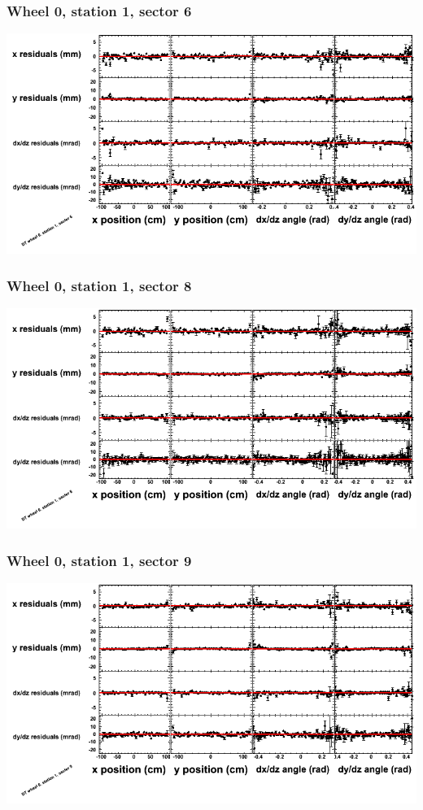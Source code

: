 \documentclass[compress]{beamer}
\begin{document}
\begin{frame}
\frametitle{Wheel 0, station 1, sector 6}
\includegraphics[width=\linewidth]{tmppoly_MBwhCst1sec06.png}
\end{frame}

\begin{frame}
\frametitle{Wheel 0, station 1, sector 8}
\includegraphics[width=\linewidth]{tmppoly_MBwhCst1sec08.png}
\end{frame}

\begin{frame}
\frametitle{Wheel 0, station 1, sector 9}
\includegraphics[width=\linewidth]{tmppoly_MBwhCst1sec09.png}
\end{frame}
\end{document}

